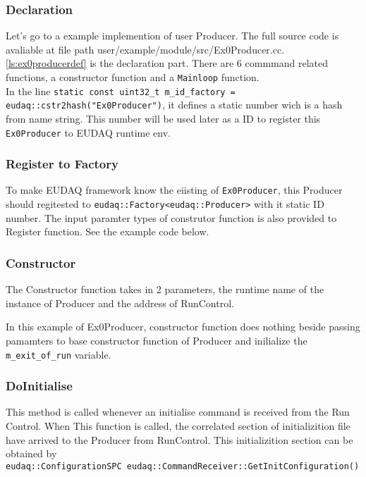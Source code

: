 \subsubsection{Declaration}
Let's go to a example implemention of user Producer. The full source code is avaliable at file path user/example/module/src/Ex0Producer.cc.  \autoref{ls:ex0producerdef} is the declaration part. There are 6 commmand related functions, a constructor function and a \texttt{Mainloop} function. \\



In the line \lstinline[style=cpp]{static const uint32_t m_id_factory = eudaq::cstr2hash("Ex0Producer")}, it defines a static number wich is a hash from name string. This number will be used later as a ID to register this \lstinline[style=cpp]{Ex0Producer} to EUDAQ runtime env.

\subsubsection{Register to Factory}
To make EUDAQ framework know the eiisting of \lstinline[style=cpp]{Ex0Producer}, this Producer should regitested to \lstinline[style=cpp]{eudaq::Factory<eudaq::Producer>} with it static ID number. The input paramter types of construtor function is also provided to Register function. See the example code below.


\subsubsection{Constructor}
The Constructor function takes in 2 parameters, the runtime name of the instance of Producer and the address of RunControl. 

In this example of Ex0Producer, constructor function does nothing beside passing pamamters to base constructor function of Producer and inilialize the \lstinline[style=cpp]{m_exit_of_run} variable.

\subsubsection{DoInitialise}
This method is called whenever an initialise command is received from the Run Control. When This function is called, the correlated section of initializition file have arrived to the Producer from RunControl. This initializition section can be obtained by \\
\lstinline[style=cpp]{eudaq::ConfigurationSPC eudaq::CommandReceiver::GetInitConfiguration()} \\


